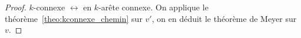 \begin{mytheo} [Menger]
\begin{proof}
    $k$-connexe $\leftrightarrow$ en $k$-arête connexe.
    On applique le théorème~\ref{theo:kconnexe_chemin} sur $v'$,
    on en déduit le théorème de Meyer sur $v$.
  \end{proof}
\end{mytheo}
